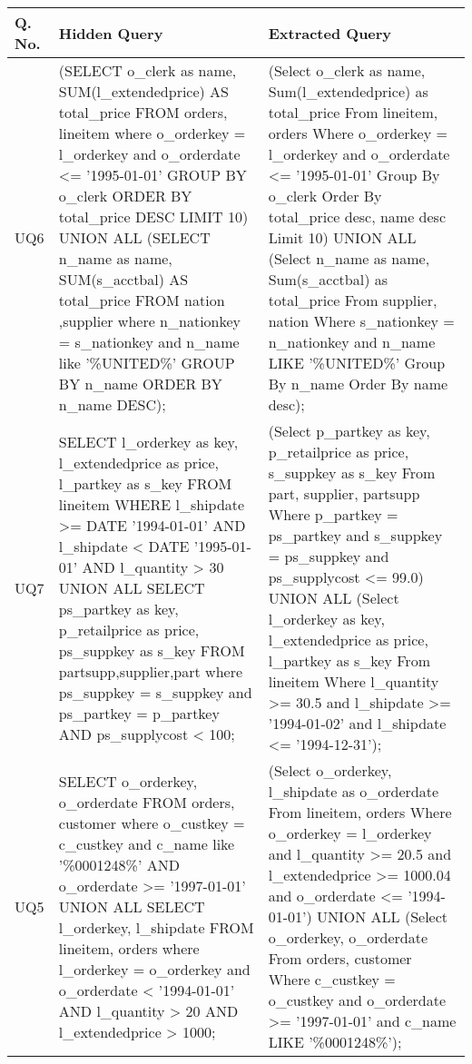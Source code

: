 {\tiny
\begin{longtable}{|p{0.5cm}|p{7cm}|p{7cm}|}
\hline
{\bf Q. No.} & {\bf Hidden Query} & {\bf Extracted Query} \\\hline\hline
UQ6&
(SELECT o\_clerk as name, SUM(l\_extendedprice) AS total\_price FROM orders, lineitem where o\_orderkey = l\_orderkey and o\_orderdate <= '1995-01-01' GROUP BY o\_clerk ORDER BY total\_price DESC LIMIT 10) UNION ALL (SELECT n\_name as name, SUM(s\_acctbal) AS total\_price FROM nation ,supplier where n\_nationkey = s\_nationkey and n\_name like '\%UNITED\%' GROUP BY n\_name ORDER BY n\_name DESC);&
(Select o\_clerk as name, Sum(l\_extendedprice) as total\_price From lineitem, orders Where o\_orderkey = l\_orderkey and o\_orderdate  <= '1995-01-01' Group By o\_clerk Order By total\_price desc, name desc Limit 10)  UNION ALL  (Select n\_name as name, Sum(s\_acctbal) as total\_price From supplier, nation Where s\_nationkey = n\_nationkey and n\_name LIKE '\%UNITED\%' Group By n\_name Order By name desc);\\\hline
UQ7&
SELECT     l\_orderkey as key,     l\_extendedprice as price,     l\_partkey as s\_key FROM     lineitem WHERE     l\_shipdate >= DATE '1994-01-01'     AND l\_shipdate < DATE '1995-01-01'     AND l\_quantity > 30  UNION ALL  SELECT     ps\_partkey as key,     p\_retailprice as price,     ps\_suppkey as s\_key FROM     partsupp,supplier,part where ps\_suppkey = s\_suppkey and ps\_partkey = p\_partkey     AND ps\_supplycost < 100;&
(Select p\_partkey as key, p\_retailprice as price, s\_suppkey as s\_key From part, supplier, partsupp Where p\_partkey = ps\_partkey and s\_suppkey = ps\_suppkey and ps\_supplycost  <= 99.0)  UNION ALL  (Select l\_orderkey as key, l\_extendedprice as price, l\_partkey as s\_key From lineitem Where l\_quantity  >= 30.5 and l\_shipdate  >= '1994-01-02' and l\_shipdate <= '1994-12-31');\\\hline
UQ5&
SELECT o\_orderkey, o\_orderdate FROM orders, customer where o\_custkey = c\_custkey and c\_name like '\%0001248\%'  AND o\_orderdate >= '1997-01-01' UNION ALL SELECT l\_orderkey, l\_shipdate FROM lineitem, orders where l\_orderkey = o\_orderkey and o\_orderdate < '1994-01-01'   AND l\_quantity > 20   AND l\_extendedprice > 1000;&
(Select o\_orderkey, l\_shipdate as o\_orderdate From lineitem, orders Where o\_orderkey = l\_orderkey and l\_quantity  >= 20.5 and l\_extendedprice  >= 1000.04 and o\_orderdate  <= '1994-01-01')  UNION ALL  (Select o\_orderkey, o\_orderdate From orders, customer Where c\_custkey = o\_custkey and o\_orderdate  >= '1997-01-01' and c\_name LIKE '\%0001248\%');\\\hline

\end{longtable}}
